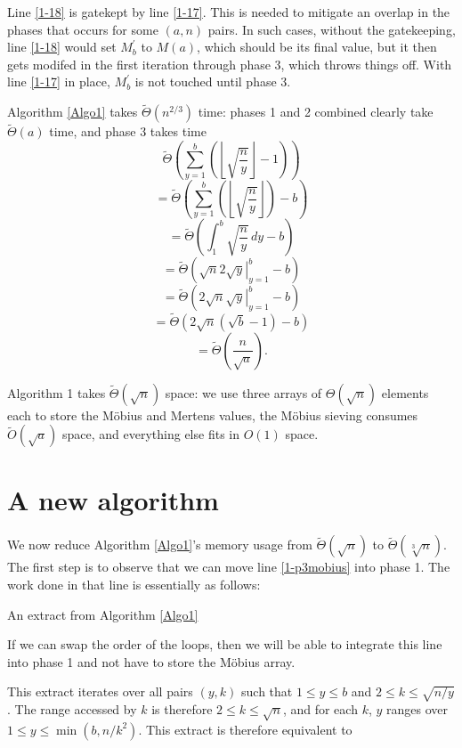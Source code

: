 \documentclass[12pt]{article}
\newcommand{\eqn}[1]{\begin{displaymath} #1 \end{displaymath}}
\newcommand{\floor}[1]{{\left\lfloor #1 \right\rfloor}}
\newcommand{\integral}[4]{\displaystyle\int_{#3}^{#4} \! #1 \, d#2}
\newcommand{\eval}[3]{\left. #1 \right|_{#2}^{#3}}
\newcommand{\dfloordiv}[2]{\floor{\dfrac{#1}{#2}}}
\newcommand{\isqrt}[1]{\floor{\sqrt{#1}}}
\newcommand{\softTheta}[0]{\widetilde{\Theta}}
\begin{document}
Line \ref{1-18} is gatekept by line \ref{1-17}.  This is needed to mitigate an overlap in the phases that occurs for some $(a,n)$ pairs.  In such cases, without the gatekeeping, line \ref{1-18} would set $M^\prime_b$ to $M(a)$, which should be its final value, but it then gets modifed in the first iteration through phase 3, which throws things off.  With line \ref{1-17} in place, $M^\prime_b$ is not touched until phase 3.

Algorithm \ref{Algo1} takes $\softTheta(n^{2/3})$ time: phases 1 and 2 combined clearly take $\softTheta(a)$ time, and phase 3 takes time
\eqn{\softTheta \left( \sum_{y=1}^b \left( \isqrt{\frac{n}{y}} - 1 \right) \right)}
\eqn{= \softTheta \left( \sum_{y=1}^b \left( \isqrt{\frac{n}{y}} \right) - b \right)}
\eqn{= \softTheta \left( \integral{ \sqrt{\frac{n}{y}} }{y}{1}{b} - b \right)}
\eqn{= \softTheta \left( \sqrt{n} 2 \eval{\sqrt{y}}{y=1}{b} - b \right)}
\eqn{= \softTheta \left( 2 \sqrt{n} \eval{\sqrt{y}}{y=1}{b} - b \right)}
\eqn{= \softTheta \left( 2 \sqrt{n} \left( \sqrt{b} - 1 \right) - b \right)}
\eqn{= \softTheta \left( \frac{n}{\sqrt{a}} \right).}

Algorithm 1 takes $\softTheta(\sqrt{n})$ space: we use three arrays of $\Theta(\sqrt{n})$ elements each to store the M\"{o}bius and Mertens values, the M\"{o}bius sieving consumes $\widetilde{O}(\sqrt{a})$ space, and everything else fits in $O(1)$ space.

\section{A new algorithm}

We now reduce Algorithm \ref{Algo1}'s memory usage from $\softTheta(\sqrt{n})$ to $\softTheta(\sqrt[3]{n})$.  The first step is to observe that we can move line \ref{1-p3mobius} into phase 1.  The work done in that line is essentially as follows:

\begin{algorithm}[H] \label{Algo1mu}
\DontPrintSemicolon
\caption{An extract from Algorithm \ref{Algo1}}
\Begin{
    \For{$y=b$ \KwTo $1$}{
        \For{$k=2$ \KwTo $\isqrt{n/y}$}{
            $M^\prime_y \gets M^\prime_y - \mu_k \cdot \dfloordiv{n}{yk}$
        }
    }
}
\end{algorithm}

If we can swap the order of the loops, then we will be able to integrate this line into phase 1 and not have to store the M\"{o}bius array.

This extract iterates over all pairs $(y,k)$ such that $1 \leq y \leq b$ and $2 \leq k \leq \sqrt{n/y}$.  The range accessed by $k$ is therefore $2 \leq k \leq \sqrt{n}$, and for each $k$, $y$ ranges over $1 \leq y \leq \min(b, n/k^2)$.  This extract is therefore equivalent to
\end{document}
